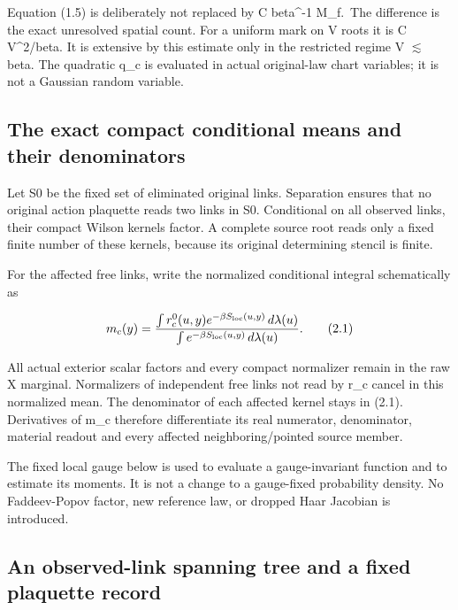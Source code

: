 \documentclass[
  11pt,
]{article}
\begin{document}
Equation (1.5) is deliberately not replaced by C beta\^{}-1 M\_f.~The
difference is the exact unresolved spatial count. For a uniform mark on
V roots it is C V\^{}2/beta. It is extensive by this estimate only in
the restricted regime V \(\lesssim\) beta. The quadratic q\_c is
evaluated in actual original-law chart variables; it is not a Gaussian
random variable.

\hypertarget{the-exact-compact-conditional-means-and-their-denominators}{%
\subsection{The exact compact conditional means and their
denominators}\label{the-exact-compact-conditional-means-and-their-denominators}}

Let S0 be the fixed set of eliminated original links. Separation ensures
that no original action plaquette reads two links in S0. Conditional on
all observed links, their compact Wilson kernels factor. A complete
source root reads only a fixed finite number of these kernels, because
its original determining stencil is finite.

For the affected free links, write the normalized conditional integral
schematically as

\[
 m_c(y)=
 \frac{\int r_c^0(u,y)e^{-\beta S_{\rm loc}(u,y)}\,d\lambda(u)}
      {\int e^{-\beta S_{\rm loc}(u,y)}\,d\lambda(u)}.
\tag{2.1}
\]

All actual exterior scalar factors and every compact normalizer remain
in the raw X marginal. Normalizers of independent free links not read by
r\_c cancel in this normalized mean. The denominator of each affected
kernel stays in (2.1). Derivatives of m\_c therefore differentiate its
real numerator, denominator, material readout and every affected
neighboring/pointed source member.

The fixed local gauge below is used to evaluate a gauge-invariant
function and to estimate its moments. It is not a change to a
gauge-fixed probability density. No Faddeev-Popov factor, new reference
law, or dropped Haar Jacobian is introduced.

\hypertarget{an-observed-link-spanning-tree-and-a-fixed-plaquette-record}{%
\subsection{An observed-link spanning tree and a fixed plaquette
record}\label{an-observed-link-spanning-tree-and-a-fixed-plaquette-record}}
\end{document}
